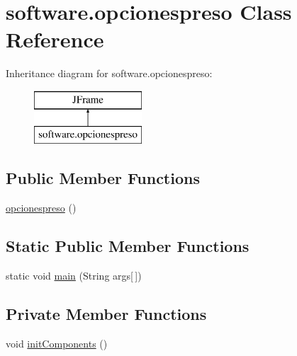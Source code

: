 \hypertarget{classsoftware_1_1opcionespreso}{}\section{software.\+opcionespreso Class Reference}
\label{classsoftware_1_1opcionespreso}
Inheritance diagram for software.\+opcionespreso\+:\begin{figure}[H]
\begin{center}
\leavevmode
\includegraphics[height=2.000000cm]{classsoftware_1_1opcionespreso}
\end{center}
\end{figure}
\subsection*{Public Member Functions}
\begin{DoxyCompactItemize}
\item 
\mbox{\hyperlink{classsoftware_1_1opcionespreso_a7a3faf552876ca7ad20b768f262bee92}{opcionespreso}} ()
\end{DoxyCompactItemize}
\subsection*{Static Public Member Functions}
\begin{DoxyCompactItemize}
\item 
static void \mbox{\hyperlink{classsoftware_1_1opcionespreso_a7aaff594f3bae88e5df8471683979b78}{main}} (String args\mbox{[}$\,$\mbox{]})
\end{DoxyCompactItemize}
\subsection*{Private Member Functions}
\begin{DoxyCompactItemize}
\item 
void \mbox{\hyperlink{classsoftware_1_1opcionespreso_a6bc69bb840871d48ada42e019670b660}{init\+Components}} ()
\end{DoxyCompactItemize}

